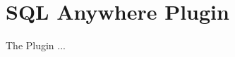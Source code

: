 
\section{SQL Anywhere Plugin}\label{sec:sqlanywhere}

\updatedisclaimer

The  Plugin ...

\FloatBarrier
